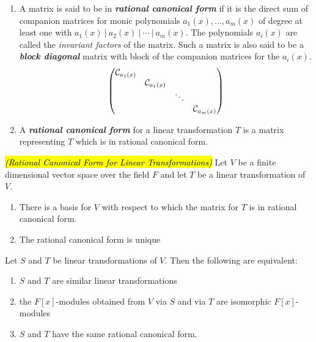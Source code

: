 \nl

\begin{defn}\nl
\begin{enumerate}
\item A matrix is said to be in \textit{\textbf{rational canonical form}} if it is the direct sum of companion matrices for monic polynomials $a_1(x), \ldots, a_m(x)$ of degree at least one with $a_1(x)\ |\  a_2(x)\ |\ \cdots\ |\  a_m(x).$ The polynomials $a_i(x)$ are called the \textit{invariant factors} of the matrix. Such a matrix is also said to be a \textit{\textbf{block diagonal}} matrix with block of the companion matrices for the $a_i(x)$.
\[\begin{pmatrix}
\mathcal{C}_{a_1(x)} & & & \\
& \mathcal{C}_{a_1(x)} & & \\
& & \ddots & \\
& & & \mathcal{C}_{a_m(x)}
\end{pmatrix}\]
\item A \textit{\textbf{rational canonical form}} for a linear transformation $T$ is a matrix representing $T$ which is in rational canonical form.
\end{enumerate}
\end{defn}

\nl

\begin{thm}\hl{\textit{(Rational Canonical Form for Linear Transformations)}}
Let $V$ be a finite dimensional vector space over the field $F$ and let $T$ be a linear transformation of $V$.
\begin{enumerate}
\item There is a basis for $V$ with respect to which the matrix for $T$ is in rational canonical form.
\item The rational canonical form is unique
\end{enumerate}
\end{thm}

\nl

\begin{thm}
Let $S$ and $T$ be linear transformations of $V$. Then the following are equivalent:
\begin{enumerate}
\item $S$ and $T$ are similar linear transformations
\item the $F[x]$-modules obtained from $V$ via $S$ and via $T$ are isomorphic $F[x]$-modules
\item $S$ and $T$ have the same rational canonical form.
\end{enumerate}
\end{thm}

